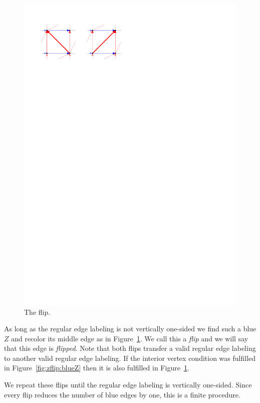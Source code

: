 \begin{figure}[!b]
    \includegraphics[scale=1]{unifiedAlgo/img/zflip/flip.pdf}
    \caption{The flip.}
    \label{fig:zflip:flip}
  \end{figure}

  As long as the regular edge labeling is not vertically one-sided we find such a blue $Z$ and recolor its middle edge as in Figure~\ref{fig:zflip:flip}. We call this a \emph{flip} and we will say that this edge is \emph{flipped}.
  Note that both flips transfer a valid regular edge labeling to another valid regular edge labeling. If the interior vertex condition was fulfilled in Figure~\ref{fig:zflip:blueZ} then it is also fulfilled in Figure~\ref{fig:zflip:flip}.

  We repeat these flips until the regular edge labeling is vertically one-sided.
  Since every flip reduces the number of blue edges by one, this is a finite procedure.


